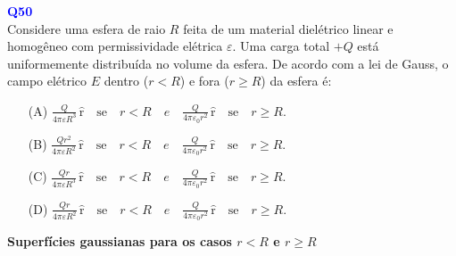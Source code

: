 \documentclass[a4paper,12pt]{article}
\begin{document}
\begin{flushleft}
\textbf{\textcolor{blue}{\Large Q50}}\\
\noindent
Considere uma esfera de raio \( R \) feita de um material dielétrico linear e homogêneo com permissividade elétrica \( \varepsilon \).  
Uma carga total \( +Q \) está uniformemente distribuída no volume da esfera. De acordo com a lei de Gauss, o campo elétrico \( E \) 
dentro (\( r < R \)) e fora (\( r \geq R \)) da esfera é:


\begin{itemize}
\item[(A)] $\frac{Q}{4\pi\varepsilon R^3} \, \hat{\textrm{r}} \quad \text{se} \quad r < R \quad e \quad \frac{Q}{4\pi\varepsilon_0 r^2} \, \hat{\textrm{r}} \quad \text{se} \quad r \geq R. $
\item[(B)] $\frac{Q r^2}{4\pi\varepsilon R^2} \, \hat{\textrm{r}} \quad \text{se} \quad r < R \quad e \quad \frac{Q}{4\pi\varepsilon_0 r^2} \, \hat{\textrm{r}}  \quad \text{se} \quad r \geq R.$
\item[(C)] $\frac{Q r}{4\pi\varepsilon R^3} \, \hat{\textrm{r}} \quad \text{se} \quad r < R \quad e \quad \frac{Q}{4\pi\varepsilon_0 r^2} \, \hat{\textrm{r}} \quad \text{se} \quad r \geq R.$
\item[(D)] $\frac{Q r}{4\pi\varepsilon R^2} \, \hat{\textrm{r}} \quad \text{se} \quad r < R \quad e \quad \frac{Q}{4\pi\varepsilon_0 r^2} \, \hat{\textrm{r}} \quad \text{se} \quad r \geq R.$
\end{itemize}

\vspace{0.5cm}

\begin{center}
\textbf{Superfícies gaussianas para os casos \(r<R\) e \(r\geq R\)}
\end{center}

\begin{center}
\end{center}
\end{flushleft}
\end{document}
